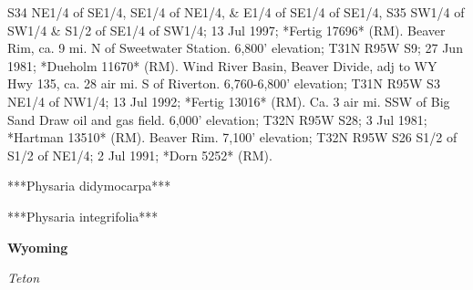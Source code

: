 S34 NE1/4 of SE1/4, SE1/4 of NE1/4, \& E1/4 of SE1/4 of SE1/4, S35 SW1/4 of SW1/4 \& S1/2 of SE1/4 of SW1/4; 13 Jul 1997; *Fertig 17696* (RM).  Beaver Rim, ca. 9 mi. N of Sweetwater Station. 6,800' elevation; T31N R95W S9; 27 Jun 1981; *Dueholm 11670* (RM).  Wind River Basin, Beaver Divide, adj to WY Hwy 135, ca. 28 air mi. S of Riverton. 6,760-6,800' elevation; T31N R95W S3 NE1/4 of NW1/4; 13 Jul 1992; *Fertig 13016* (RM).  Ca. 3 air mi. SSW of Big Sand Draw oil and gas field. 6,000' elevation; T32N R95W S28; 3 Jul 1981; *Hartman 13510* (RM).  Beaver Rim. 7,100' elevation; T32N R95W S26 S1/2 of S1/2 of NE1/4; 2 Jul 1991; *Dorn 5252* (RM).



***Physaria didymocarpa***

***Physaria integrifolia***

\textbf{Wyoming} %

\textit{Teton}

